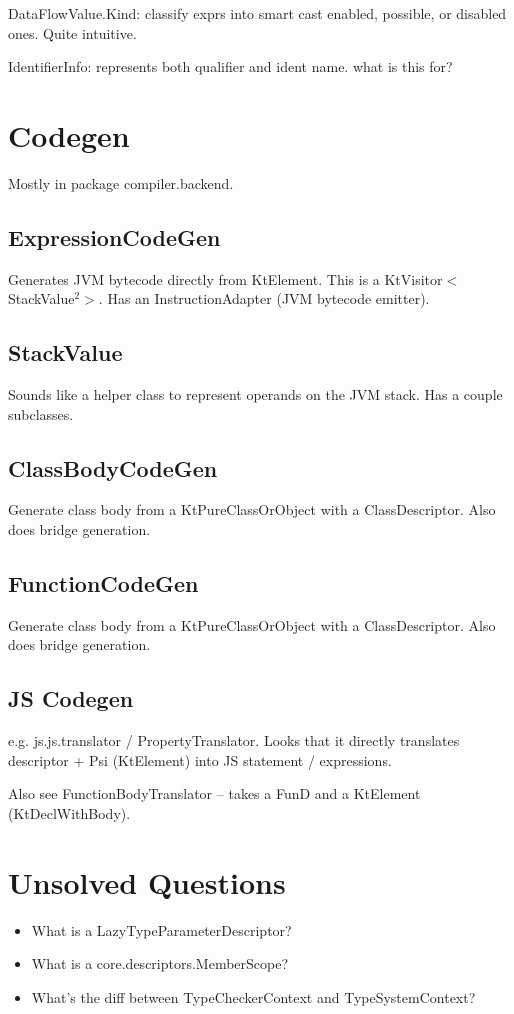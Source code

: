\documentclass{article}
\begin{document}
DataFlowValue.Kind: classify exprs into smart cast enabled, possible, or disabled ones. Quite intuitive.

IdentifierInfo: represents both qualifier and ident name. what is this for?

\section{Codegen}
Mostly in package compiler.backend.

\subsection{ExpressionCodeGen}
Generates JVM bytecode directly from KtElement. This is a KtVisitor$<$StackValue$^2$$>$. Has an InstructionAdapter (JVM bytecode emitter).

\subsection{StackValue}
Sounds like a helper class to represent operands on the JVM stack. Has a couple subclasses.

\subsection{ClassBodyCodeGen}
Generate class body from a KtPureClassOrObject with a ClassDescriptor. Also does bridge generation.

\subsection{FunctionCodeGen}
Generate class body from a KtPureClassOrObject with a ClassDescriptor. Also does bridge generation.

\subsection{JS Codegen}

e.g. js.js.translator / PropertyTranslator. Looks that it directly translates descriptor + Psi (KtElement) into JS statement / expressions.

Also see FunctionBodyTranslator -- takes a FunD and a KtElement (KtDeclWithBody).

\section{Unsolved Questions}

\begin{itemize}
    \item What is a LazyTypeParameterDescriptor?
    \item What is a core.descriptors.MemberScope?
    \item What's the diff between TypeCheckerContext and TypeSystemContext?
\end{itemize}


\newpage
\printnomenclature
\end{document}
